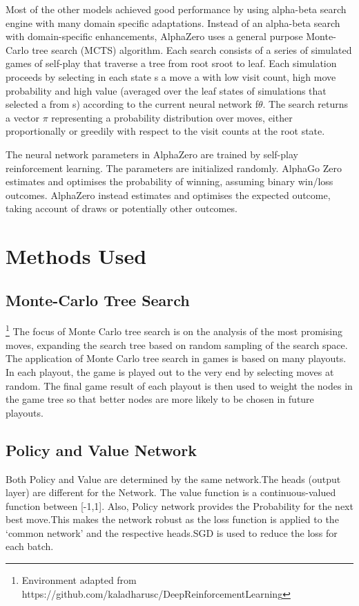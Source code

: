 \documentclass{article}
\begin{document}
Most of the other models achieved good performance by using alpha-beta search engine with many domain specific adaptations. Instead of an alpha-beta search with domain-specific enhancements, AlphaZero uses a general purpose Monte-Carlo tree search (MCTS) algorithm. Each search consists of a series of simulated games of self-play that traverse a tree from root sroot to leaf. Each simulation proceeds by selecting in each state s a move a with low visit count, high move probability and high value (averaged over the leaf states of simulations that selected a from s) according to the current neural network f$\theta$.
The search returns a vector $\pi$ representing a probability distribution over moves, either proportionally or greedily with respect to the visit counts at the root state.

The neural network parameters in AlphaZero are trained by self-play reinforcement learning. The parameters are initialized randomly. AlphaGo Zero estimates and optimises the probability of winning, assuming binary win/loss outcomes. AlphaZero instead estimates and optimises the expected outcome, taking account of draws or potentially other outcomes.


\section{Methods Used}

\subsection{Monte-Carlo Tree Search}\footnote[1]{Environment adapted from             https://github.com/kaladharusc/DeepReinforcementLearning}
The focus of Monte Carlo tree search is on the analysis of the most promising moves, expanding the search tree based on random sampling of the search space. The application of Monte Carlo tree search in games is based on many playouts. In each playout, the game is played out to the very end by selecting moves at random. The final game result of each playout is then used to weight the nodes in the game tree so that better nodes are more likely to be chosen in future playouts.

\subsection{Policy and Value Network}
    Both Policy and Value are determined by the same network.The heads (output layer) are different for the Network. The value function is a continuous-valued function between [-1,1]. Also, Policy network provides the Probability for the next best move.This makes the network robust as the loss function is applied to the ‘common network’ and the respective heads.SGD is used to reduce the loss for each batch.
\end{document}
